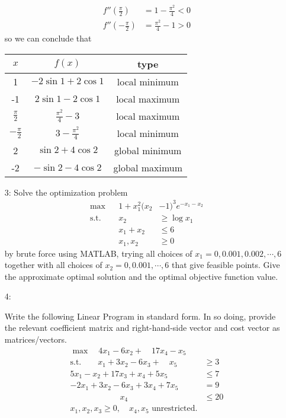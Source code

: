 \documentclass{article}
\begin{document}
\begin{itemize}
\begin{soln}
\begin{align*}
				f''\left( \frac{\pi}{2} \right) &= 1-\frac{\pi^2}{4} < 0 \\
				f''\left( -\frac{\pi}{2} \right) &= \frac{\pi^2}{4}-1 > 0
			\end{align*} so we can conclude that
			\begin{center}
				\begin{tabular}{c|c|c}
					$x$ & $f(x)$ & type \\
					\hline
					1 & $-2\sin 1+2\cos 1$ & local minimum \\
					-1 & $2\sin 1 - 2\cos 1$ & local maximum \\
					$\frac{\pi}{2}$ & $\frac{\pi^2}{4} - 3$ & local maximum \\
					$-\frac{\pi}{2}$ & $3-\frac{\pi^2}{4}$ & local minimum \\
					2 & $\sin 2 + 4\cos 2$ & global minimum \\
					-2 & $-\sin2-4\cos2$ & global maximum
				\end{tabular}
			\end{center}
		\end{soln}



		\newpage

	\item[3:] Solve the optimization problem
		\begin{align*}
			\max & & 1+x_1^2(x_2&-1)^3 e^{-x_1-x_2} \\
			\text{s.t.} & & x_2&\ge\log x_1 \\
			& &x_1+x_2 &\le 6 \\
			& &x_1, x_2 &\ge 0
		\end{align*} by brute force using MATLAB, trying all choices of $x_1=0, 0.001, 0.002, \cdots, 6$ together with all choices of $x_2=0, 0.001, \cdots, 6$ that give feasible points. Give the approximate optimal solution and the optimal objective function value.
		

	\item[4:] 
		\begin{enumerate}[a)]
			\ii Write the following Linear Program in standard form. In so doing, provide the relevant coefficient matrix and right-hand-side vector and cost vector as matrices/vectors.
			\begin{align*}
				\max\quad 4x_1-6x_2+\quad17x_4-x_5 & \\
				\text{s.t.}\quad\quad x_1+3x_2-6x_3+\quad x_5 &\ge 3 \\
				5x_1-x_2+17x_3+x_4+5x_5 &\le 7 \\
				-2x_1+3x_2-6x_3+3x_4+7x_5 &= 9 \\
				\quad\quad\quad\quad\quad\quad x_4\quad &\le 20 \\
				x_1, x_2, x_3\ge 0, \quad x_4, x_5 \text{ unrestricted.}
			\end{align*}


\end{enumerate}
\end{itemize}
\end{document}

